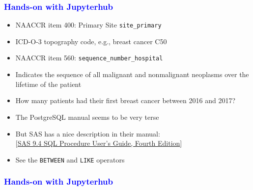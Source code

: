 \documentclass[11pt,pdftex,dvipsnames,usenames]{beamer}
\begin{document}
\begin{frame}[fragile]\frametitle{\bf\textcolor{blue}{Hands-on with Jupyterhub}}
\begin{itemize}
\item NAACCR item 400: Primary Site \texttt{site\_primary}
\item ICD-O-3 topography code, e.g., breast cancer C50
\item NAACCR item 560: \texttt{sequence\_number\_hospital}
\item Indicates the sequence of all malignant and nonmalignant
neoplasms over the lifetime of the patient
\item How many patients had their first breast cancer between
2016 and 2017?
\item The PostgreSQL manual seems to be very terse
\item But SAS has a nice description in their manual: \\
\textcolor{PineGreen}{[\href{https://documentation.sas.com/doc/en/pgmsascdc/9.4_3.5/sqlproc/titlepage.htm}{SAS 9.4 SQL Procedure User’s Guide, Fourth Edition}]}
\item See the \texttt{BETWEEN} and \texttt{LIKE} operators
\end{itemize}
\end{frame}

\begin{frame}[fragile]\frametitle{\bf\textcolor{blue}{Hands-on with Jupyterhub}}

\end{frame}
\end{document}
